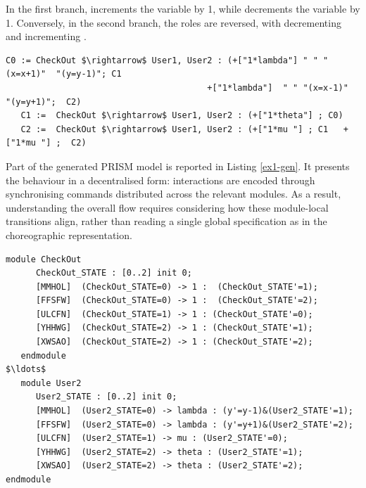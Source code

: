  In the first branch,  increments the variable  by 1, while  decrements the variable  by 1. Conversely, in the second branch, the roles are reversed, with  decrementing  and  incrementing .

 \begin{lstlisting}[style=chor-color,breaklines=true, postbreak=\mbox{\textcolor{red}{$\hookrightarrow$}\space},caption={Choreography for the Modified thinkteam Protocol},captionpos=b,label={ex1-chor}]
   C0 := CheckOut $\rightarrow$ User1, User2 : (+["1*lambda"] " " "(x=x+1)"  "(y=y-1)"; C1
                                       	+["1*lambda"]  " " "(x=x-1)"  "(y=y+1)";  C2)
   C1 :=  CheckOut $\rightarrow$ User1, User2 : (+["1*theta"] ; C0)  
   C2 :=  CheckOut $\rightarrow$ User1, User2 : (+["1*mu "] ; C1   +["1*mu "] ;  C2)
 \end{lstlisting}

 Part of the generated PRISM model is reported in Listing \ref{ex1-gen}. 
It presents the behaviour in a decentralised form: 
interactions are encoded through synchronising commands distributed across the relevant modules. 
As a result, understanding the overall flow requires considering 
how these module-local transitions align, 
rather than reading a single global specification as in the choreographic representation.
\begin{lstlisting}[style=prism-color,caption={Part of the generated PRISM model for the Modified thinkteam Protocol},captionpos=b,label={ex1-gen}]
   module CheckOut
      CheckOut_STATE : [0..2] init 0;
      [MMHOL]  (CheckOut_STATE=0) -> 1 :  (CheckOut_STATE'=1);
      [FFSFW]  (CheckOut_STATE=0) -> 1 :  (CheckOut_STATE'=2);
      [ULCFN]  (CheckOut_STATE=1) -> 1 : (CheckOut_STATE'=0);
      [YHHWG]  (CheckOut_STATE=2) -> 1 : (CheckOut_STATE'=1);
      [XWSAO]  (CheckOut_STATE=2) -> 1 : (CheckOut_STATE'=2);
   endmodule
$\ldots$
   module User2
      User2_STATE : [0..2] init 0;
      [MMHOL]  (User2_STATE=0) -> lambda : (y'=y-1)&(User2_STATE'=1);
      [FFSFW]  (User2_STATE=0) -> lambda : (y'=y+1)&(User2_STATE'=2);
      [ULCFN]  (User2_STATE=1) -> mu : (User2_STATE'=0);
      [YHHWG]  (User2_STATE=2) -> theta : (User2_STATE'=1);
      [XWSAO]  (User2_STATE=2) -> theta : (User2_STATE'=2);
endmodule
\end{lstlisting}


